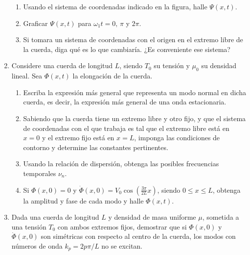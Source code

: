 \documentclass[11pt,spanish]{article}
\begin{document}
\begin{enumerate}
    \begin{enumerate}
        \item Usando el sistema de coordenadas indicado en la figura, halle
        $\Psi(x,t)$.

        \item Graficar $\Psi(x,t)$ para $\omega_{1}t=0,\,\pi$ y $2\pi$.

        \item Si tomara un sistema de coordenadas con el origen en el extremo
        libre de la cuerda, diga qué es lo que cambiaría. ¿Es conveniente ese
        sistema?
    \end{enumerate}


    \item Considere una cuerda de longitud $L$, siendo $T_{0}$ su tensión y
    $\mu_{0}$ su densidad lineal. Sea $\Phi(x,t)$ la elongación de la cuerda.

    \begin{enumerate}
        \item Escriba la expresión más general que representa un modo normal en
        dicha cuerda, es decir, la expresión más general de una onda
        estacionaria.

        \item Sabiendo que la cuerda tiene un extremo libre y otro fijo, y que
        el sistema de coordenadas con el que trabaja es tal que el extremo libre
        está en $x=0$ y el extremo fijo está en $x=L$, imponga las condiciones
        de contorno y determine las constantes pertinentes.

        \item Usando la relación de dispersión, obtenga las posibles frecuencias
        temporales $\nu_{n}$.

        \item Si $\Phi(x,0)=0$ y $\dot{\Phi}(x,0)=V_{0}\cos\left(\frac{3\pi}{2L}x\right)$,
        siendo $0\le x\le L$, obtenga la amplitud y fase de cada modo y halle
        $\Phi(x,t)$.
    \end{enumerate}


    \item Dada una cuerda de longitud $L$ y densidad de masa uniforme $\mu$,
    sometida a una tensión $T_{0}$ con ambos extremos fijos, demostrar que si
    $\Phi(x,0)$ y $\dot{\Phi}(x,0)$ son simétricas con respecto al centro de la
    cuerda, los modos con números de onda $k_{p}=2p\pi/L$ no se excitan.


\end{enumerate}
\end{document}
